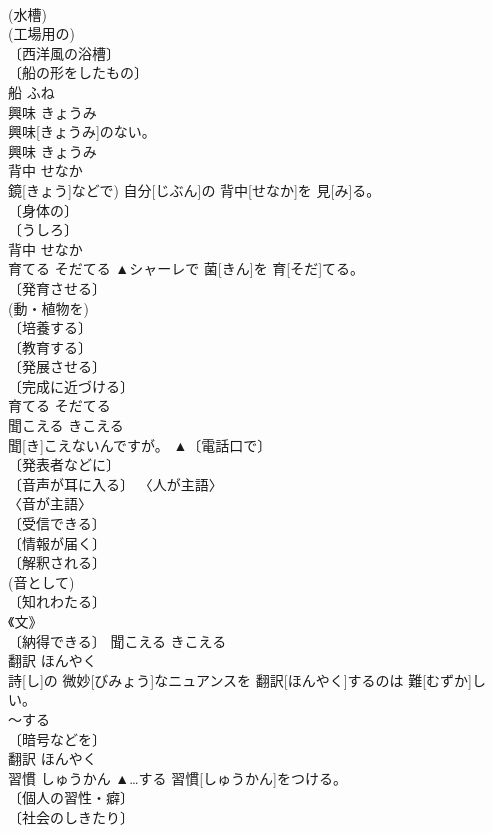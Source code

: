 \documentclass[8pt]{extreport}
\begin{document}
\begin{CJK}{UTF8}{min}
\\	(水槽) 
\\	(工場用の) 
\\	〔西洋風の浴槽〕 
\\	〔船の形をしたもの〕 
\\	船	ふね	
\\	興味	きょうみ	
\\	興味[きょうみ]のない。	
\\	興味	きょうみ	
\\	背中	せなか	
\\	鏡[きょう]などで) 自分[じぶん]の 背中[せなか]を 見[み]る。	
\\	〔身体の〕 
\\	〔うしろ〕 
\\	背中	せなか	
\\	育てる	そだてる	▲シャーレで 菌[きん]を 育[そだ]てる。	
\\	〔発育させる〕 
\\	(動・植物を) 
\\	〔培養する〕 
\\	〔教育する〕 
\\	〔発展させる〕 
\\	〔完成に近づける〕 
\\	育てる	そだてる	
\\	聞こえる	きこえる	
\\	聞[き]こえないんですが。	▲〔電話口で〕 
\\	〔発表者などに〕 
\\	〔音声が耳に入る〕 〈人が主語〉 
\\	〈音が主語〉 
\\	〔受信できる〕 
\\	〔情報が届く〕 
\\	〔解釈される〕 
\\	(音として) 
\\	〔知れわたる〕 
\\	《文》 
\\	〔納得できる〕	聞こえる	きこえる	
\\	翻訳	ほんやく	
\\	詩[し]の 微妙[びみょう]なニュアンスを 翻訳[ほんやく]するのは 難[むずか]しい。	
\\	～する 
\\	〔暗号などを〕 
\\	翻訳	ほんやく	
\\	習慣	しゅうかん	▲…する 習慣[しゅうかん]をつける。	
\\	〔個人の習性・癖〕 
\\	〔社会のしきたり〕 

\end{CJK}
\end{document}
